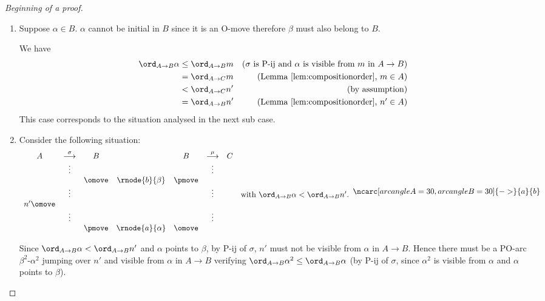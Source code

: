\begin{proof}[Beginning of a proof]
\begin{enumerate}[I.]
\begin{enumerate}
\begin{enumerate}
\begin{enumerate}
\item Suppose $\alpha \in B$. $\alpha$ cannot be initial in $B$ since it is an O-move therefore $\beta$ must also belong to $B$.

We have
\begin{align}
\ord_{A\rightarrow B} \alpha
 & \leq  \ord_{A\rightarrow B} m 
& \mbox{($\sigma$ is P-ij and $\alpha$ is visible from $m$ in $A\rightarrow B$)}  \nonumber \\
&= \ord_{A\rightarrow C} m 
& \mbox{(Lemma \ref{lem:compositionorder}, $m \in A$)}  \nonumber \\
&<  \ord_{A\rightarrow C} n'  & \mbox{(by assumption)} \nonumber \\
&=  \ord_{A\rightarrow B} n'  & \mbox{(Lemma \ref{lem:compositionorder}, $n' \in A$)}  \nonumber 
\end{align}
This case corresponds to the situation 
analysed in the next sub case.

\item Consider the following situation:
\label{case:situation}
$$ 
\begin{array}{cccccccl}
A & \stackrel\sigma{\longrightarrow} & B & & B & \stackrel\mu{\longrightarrow} & C \\
&\vdots&&& & \vdots\\
&&\omove & \rnode{b}{\beta} & \pmove \\
&\vdots& & &&\vdots && \mbox{with $\ord_{A\rightarrow B} \alpha < \ord_{A\rightarrow B} n'$.} \\
n' \omove && & &  \\
&\vdots& & &&\vdots  \\
&&\pmove & \rnode{a}{\alpha} & \omove \\
\end{array}
\ncarc[arcangleA=30,arcangleB=30]{->}{a}{b}
 $$  

Since $\ord_{A\rightarrow B} \alpha < \ord_{A\rightarrow B} n'$
and $\alpha$ points to $\beta$, by P-ij of $\sigma$, $n'$ must not be visible from $\alpha$ in $A\rightarrow B$. Hence there must be a PO-arc $\beta^2$-$\alpha^2$ jumping over $n'$ and visible from $\alpha$ in $A\rightarrow B$
verifying $\ord_{A \rightarrow B} \alpha^2 
\leq \ord_{A \rightarrow B} \alpha$ (by P-ij of $\sigma$, since $\alpha^2$ is visible from $\alpha$ and $\alpha$ points to $\beta$). 



\end{enumerate}
\end{enumerate}
\end{enumerate}
\end{enumerate}
\end{proof}
